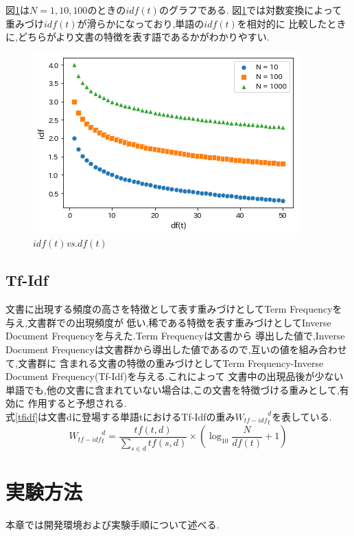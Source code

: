 \documentclass[a4j]{jarticle}
\begin{document}
図\ref{idfpic}は$N=1,10,100$のときの$idf(t)$のグラフである.
図\ref{idfpic}では対数変換によって重みづけ$idf(t)$が滑らかになっており,単語の$idf(t)$を相対的に
比較したときに,どちらがより文書の特徴を表す語であるかがわかりやすい.
\begin{figure}[H]
  \centering
  \includegraphics[scale=0.75]{idf.png}
  \caption{$idf(t)${\it vs.}$df(t)$}
 \label{idfpic}
\end{figure}
\subsection{Tf-Idf}
文書に出現する頻度の高さを特徴として表す重みづけとしてTerm Frequencyを与え,文書群での出現頻度が
低い,稀である特徴を表す重みづけとしてInverse Document Frequencyを与えた.Term Frequencyは文書から
導出した値で,Inverse Document Frequencyは文書群から導出した値であるので,互いの値を組み合わせて,文書群に
含まれる文書の特徴の重みづけとしてTerm Frequency-Inverse Document Frequency(Tf-Idf)を与える.これによって
文書中の出現品後が少ない単語でも,他の文書に含まれていない場合は,この文書を特徴づける重みとして,有効に
作用すると予想される.\\
式\ref{tfidf}は文書dに登場する単語tにおけるTf-Idfの重み${W_{tf-idf}}_t^d$を表している.
\begin{equation}
  {W_{tf-idf}}_t^d = \frac{tf(t,d)}{\sum_{s \in d}^{}tf(s,d)} \times \left( \log_{10} \frac{N}{df(t)} +1 \right)
  \label{tfidf}
\end{equation}


\section{実験方法}
本章では開発環境および実験手順について述べる.
\end{document}
